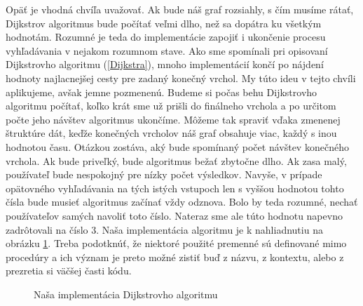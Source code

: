 Opäť je vhodná chvíľa uvažovať. Ak bude náš graf rozsiahly, s čím musíme rátať, Dijkstrov algoritmus bude počítať veľmi dlho, než sa dopátra ku všetkým hodnotám. Rozumné je teda do implementácie zapojiť i ukončenie procesu vyhľadávania v nejakom rozumnom stave. Ako sme spomínali pri opisovaní Dijkstrovho algoritmu (\ref{Dijkstra}), mnoho implementácií končí po nájdení hodnoty najlacnejšej cesty pre zadaný konečný vrchol. My túto ideu v tejto chvíli aplikujeme, avšak jemne pozmenenú. Budeme si počas behu Dijkstrovho algoritmu počítať, koľko krát sme už prišli do finálneho vrchola a po určitom počte jeho návštev algoritmus ukončíme. Môžeme tak spraviť vďaka zmenenej štruktúre dát, keďže konečných vrcholov náš graf obsahuje viac, každý s inou hodnotou času. Otázkou zostáva, aký bude spomínaný počet návštev konečného vrchola. Ak bude priveľký, bude algoritmus bežať zbytočne dlho. Ak zasa malý, používateľ bude nespokojný pre nízky počet výsledkov. Navyše, v prípade opätovného vyhľadávania na tých istých vstupoch len s vyššou hodnotou tohto čísla bude musieť algoritmus začínať vždy odznova. Bolo by teda rozumné, nechať používateľov samých navoliť toto číslo. Nateraz sme ale túto hodnotu napevno zadrôtovali na číslo $3$. Naša implementácia algoritmu je k nahliadnutiu na obrázku \ref{Dijsktra_obr2}. Treba podotknúť, že niektoré použité premenné sú definované mimo procedúry a ich význam je preto možné zistiť buď z názvu, z kontextu, alebo z prezretia si väčšej časti kódu.\newline

\begin{figure}[H]
  \caption{Naša implementácia Dijkstrovho algoritmu}
  \label{Dijsktra_obr2}
\end{figure}

